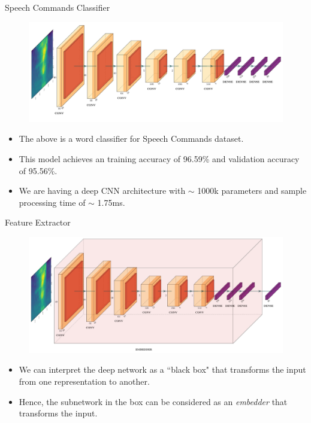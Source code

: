 \documentclass{beamer}
\begin{document}
\begin{frame}{Speech Commands Classifier}
	\begin{figure}[h]
		\centering
		\includegraphics[width=1\linewidth, height=0.35\linewidth]{../results/kws1.jpg}
		\label{fig:feature}
	\end{figure}
	
	\begin{itemize}
   		\item<1-> The above is a word classifier for Speech Commands dataset. 
		\item<2-> This model achieves an training accuracy of 96.59\% and validation accuracy of 95.56\%.
		\item<3-> We are having a deep CNN architecture with $\sim$ 1000k parameters and sample processing time of $\sim$ 1.75ms.
	\end{itemize}
\end{frame}


\begin{frame}{Feature Extractor}
	\begin{figure}[h]
		\centering
		\includegraphics[width=1\linewidth, height=0.35\linewidth]{../results/kws2.jpg}
		\label{fig:feature_embedder}
	\end{figure}
	
	\begin{itemize}
		\item<1-> We can interpret the deep network as a ``black box" that transforms the input from one representation to another.
		\item<2-> Hence, the subnetwork in the box can be considered as an \textit{embedder} that transforms the input.
	\end{itemize}
\end{frame}
\end{document}
